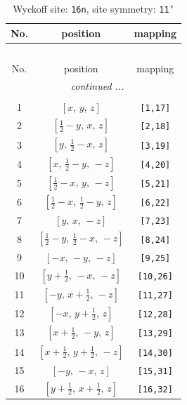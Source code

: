 \documentclass[fleqn,8pt]{jsarticle}
\begin{document}
\begin{longtable}{ccc}
\caption{Wyckoff site: {\tt 16n}, site symmetry: {\tt 11'}}
 \\
 \hline \hline
No. & position & mapping \\ \hline \endfirsthead

\multicolumn{2}{l}{\tablename\ \thetable{}} \\
 \hline \hline
No. & position & mapping \\ \hline \endhead

 \hline \hline
\multicolumn{2}{r}{\footnotesize\it continued ...} \\ \endfoot

 \hline \hline
\multicolumn{2}{r}{} \\ \endlastfoot

1 & $\left[ x,\, y,\, z \right]$ & {\tt [1,17]} \\ \hline
2 & $\left[ \frac{1}{2} - y,\, x,\, z \right]$ & {\tt [2,18]} \\ \hline
3 & $\left[ y,\, \frac{1}{2} - x,\, z \right]$ & {\tt [3,19]} \\ \hline
4 & $\left[ x,\, \frac{1}{2} - y,\, - z \right]$ & {\tt [4,20]} \\ \hline
5 & $\left[ \frac{1}{2} - x,\, y,\, - z \right]$ & {\tt [5,21]} \\ \hline
6 & $\left[ \frac{1}{2} - x,\, \frac{1}{2} - y,\, z \right]$ & {\tt [6,22]} \\ \hline
7 & $\left[ y,\, x,\, - z \right]$ & {\tt [7,23]} \\ \hline
8 & $\left[ \frac{1}{2} - y,\, \frac{1}{2} - x,\, - z \right]$ & {\tt [8,24]} \\ \hline
9 & $\left[ - x,\, - y,\, - z \right]$ & {\tt [9,25]} \\ \hline
10 & $\left[ y + \frac{1}{2},\, - x,\, - z \right]$ & {\tt [10,26]} \\ \hline
11 & $\left[ - y,\, x + \frac{1}{2},\, - z \right]$ & {\tt [11,27]} \\ \hline
12 & $\left[ - x,\, y + \frac{1}{2},\, z \right]$ & {\tt [12,28]} \\ \hline
13 & $\left[ x + \frac{1}{2},\, - y,\, z \right]$ & {\tt [13,29]} \\ \hline
14 & $\left[ x + \frac{1}{2},\, y + \frac{1}{2},\, - z \right]$ & {\tt [14,30]} \\ \hline
15 & $\left[ - y,\, - x,\, z \right]$ & {\tt [15,31]} \\ \hline
16 & $\left[ y + \frac{1}{2},\, x + \frac{1}{2},\, z \right]$ & {\tt [16,32]} \\
\end{longtable}
\end{document}
